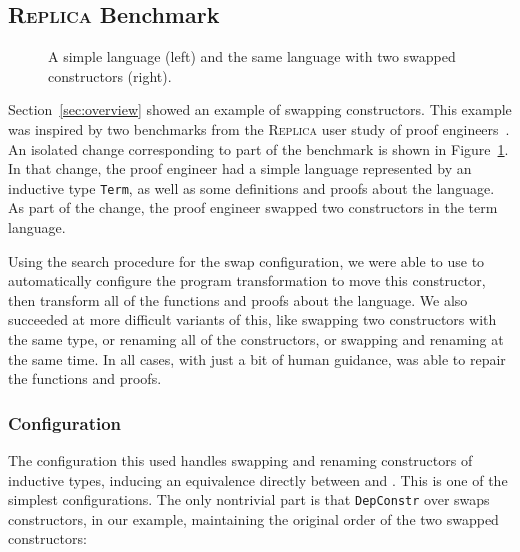\subsection{\textsc{Replica} Benchmark}
\label{sec:replica}

\begin{figure}
\begin{minipage}{0.48\textwidth}
   
\end{minipage}
\hfill
\begin{minipage}{0.48\textwidth}
   
\end{minipage}
\caption{A simple language (left) and the same language with two swapped constructors (right).}
\label{fig:replica}
\end{figure}

Section~\ref{sec:overview} showed an example of swapping constructors.
This example was inspired by two benchmarks from the \textsc{Replica} user study of proof engineers~\cite{replica}.
An isolated change corresponding to part of the benchmark is shown in Figure~\ref{fig:replica}.
In that change, the proof engineer had a simple language represented by an inductive type \lstinline{Term},
as well as some definitions and proofs about the language.
As part of the change, the proof engineer swapped two constructors in the term language.

Using the search procedure for the swap configuration, we were able to use \toolname
to automatically configure the program transformation to move this constructor,
then transform all of the functions and proofs about the language.
We also succeeded at more difficult variants of this,
like swapping two constructors with the same type, or renaming all of the constructors,
or swapping and renaming at the same time.
In all cases, with just a bit of human guidance, \toolname was able to repair the functions and proofs.

\subsubsection{Configuration}

The configuration this used handles swapping and renaming constructors of inductive types,
inducing an equivalence directly between \A and \B.
This is one of the simplest configurations.
The only nontrivial part is that \lstinline{DepConstr} over \B swaps constructors, in our example,
maintaining the original order of the two swapped constructors:

